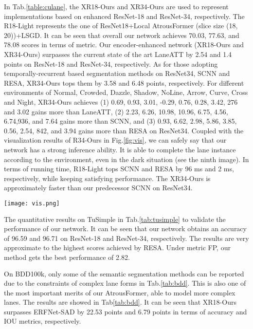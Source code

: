 \documentclass[preprint,12pt,review]{elsarticle}
\begin{document}
 In Tab.\ref{table:culane}, the XR18-Ours and XR34-Ours are used to represent implementations based on enhanced ResNet-18 and ResNet-34, respectively. The R18-Light represents the one of ResNet18+Local AtrousFormer (slice size (18, 20))+LSGD. It can be seen that overall our network achieves 70.03, 77.63, and 78.08 scores in terms of  metric. Our encoder-enhanced network (XR18-Ours and XR34-Ours) surpasses the current state of the art LaneATT by 2.54 and 1.4 points on ResNet-18 and ResNet-34, respectively. As for those adopting temporally-recurrent based segmentation methods on ResNet34, SCNN and RESA, XR34-Ours tops them by 3.58 and 6.48 points, respectively. For different environments of Normal, Crowded, Dazzle, Shadow, NoLine, Arrow, Curve, Cross and Night, 
XR34-Ours achieves (1) 0.69, 0.93, 3.01, -0.29, 0.76, 0.28, 3.42, 276 and 3.02 gains more than LaneATT, (2) 2.23, 6.26, 10.98, 10.96, 6.75, 4.56, 6.74,936, and 7.64 gains more than SCNN, and (3) 0.93, 6.62, 2.98, 5.86, 3.85, 0.56, 2.54, 842, and 3.94 gains more than RESA on ResNet34.  Coupled with the visualization results of R34-Ours in Fig.\ref{fig:vis}, we can safely say that our network has a strong inference ability. It is able to complete the lane instance according to the environment, even in the dark situation (see the ninth image).
In terms of running time, R18-Light tops SCNN and RESA by 96 ms and 2 ms, respectively, while keeping satisfying performance. The XR34-Ours is approximately  faster than our predecessor SCNN on ResNet34.

\begin{figure*}[tbp]
	\texttt{[image: vis.png]}\\ \centering
	\caption{Visualization results of R34-Ours under nine scenarios of CULane,  namely, Normal, Crowded, Dazzle, Shadow, NoLine, Arrow, Curve, Cross and Night (from left to right, from top to bottom, best viewed by zooming in). Note that in the Cross situation, only FP is calculated.} 		
	\label{fig:vis}
\end{figure*}

 The quantitative results on TuSimple in Tab.\ref{tab:tusimple} to validate the performance of our network. It can be seen that our network obtains an accuracy of 96.59 and 96.71 on ResNet-18 and ResNet-34, respectively. The results are very approximate to the highest scores achieved by RESA. Under metric FP, our method gets the best performance of 2.82.

 On BDD100k, only some of the semantic segmentation methods can be reported due to the constraints of complex lane forms in Tab.\ref{tab:bdd}.  This is also one of the most important merits of our AtrousFormer, able to model more complex lanes. The results are showed in Tab\ref{tab:bdd}. It can be seen that XR18-Ours surpasses ERFNet-SAD by 22.53 points and 6.79 points in terms of accuracy and IOU metrics, respectively.
\end{document}
